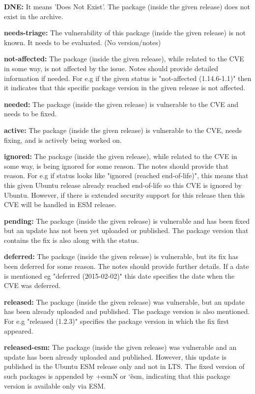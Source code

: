 \documentclass[a4paper,num-refs]{oup-contemporary}
\begin{document}
\textbf{DNE:} It means 'Does Not Exist'. The package (inside the given release) does not exist in the
		archive.

\textbf{needs-triage:} The vulnerability of this package (inside the given release)
		is not known. It needs to be evaluated.  (No version/notes)

\textbf{not-affected:} The package (inside the given release), while related to the
		CVE in some way, is not affected by the issue. Notes should
		provide detailed information if needed. For e.g if the given
		status is "not-affected (1.14.6-1.1)" then it indicates that this specific
		package version in the given release is not affected.

\textbf{needed:} The package (inside the given release) is vulnerable to the
		CVE and needs to be fixed.

\textbf{active:} The package (inside the given release) is vulnerable to the
		CVE, needs fixing, and is actively being worked on.

\textbf{ignored:} The package (inside the given release), while related to the
		CVE in some way, is being ignored for some reason.  The
		notes should provide that reason. For e.g if status looks  like
		"ignored (reached end-of-life)", this means that this given Ubuntu release already reached
		end-of-life so this CVE is ignored by Ubuntu. However, if there
		is extended security support for this release then this
		CVE will be handled in ESM release.

\textbf{pending:} The package (inside the given release) is vulnerable and
                  has been fixed but an update has not been yet uploaded or
		  published. The package version that contains the fix is also
		  along with the status.

\textbf{deferred:} The package (inside the given release) is vulnerable, but 
                   its fix has been deferred for some reason. The notes
		   should provide further details. If a date is mentioned eg
		   "deferred (2015-02-02)" this date specifies the date when
		   the CVE was deferred.

\textbf{released:} The package (inside the given release) was vulnerable, but
		an update has been already uploaded and published. The package version
		is also mentioned. For e.g "released (1.2.3)"
		specifies the package version in which the fix first appeared.

\textbf{released-esm:} The package (inside the given release) was vulnerable and
		an update has been already uploaded and published. However,
		this update is published in the Ubuntu ESM release only and not in LTS.
		The fixed version of such packages is appended by
		+esmN or \char`\~esm, indicating that this package version is available
		only via ESM.
\end{document}
